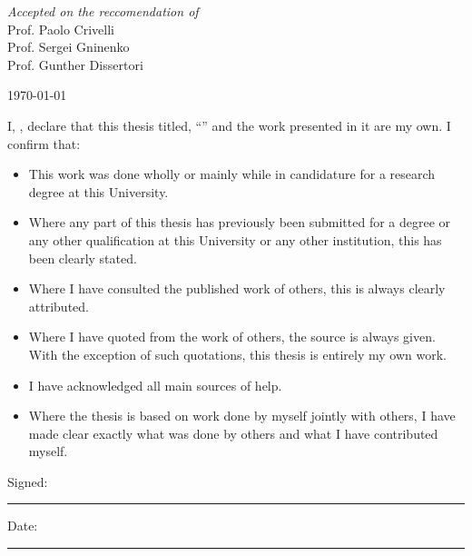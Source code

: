 \begin{titlepage}
\begin{center}

\large \textit{Accepted on the reccomendation of}\\[0.3cm] %
Prof. Paolo Crivelli\\[0.1cm]
Prof. Sergei Gninenko\\[0.1cm]
Prof. Gunther Dissertori\\[0.1cm]

\vfill

{\large \today}\\[4cm] %
 
\vfill
\end{center}
\end{titlepage}


\begin{declaration}
\addchaptertocentry{\authorshipname} %
\noindent I, \authorname, declare that this thesis titled, \enquote{\ttitle} and the work presented in it are my own. I confirm that:

\begin{itemize} 
\item This work was done wholly or mainly while in candidature for a research degree at this University.
\item Where any part of this thesis has previously been submitted for a degree or any other qualification at this University or any other institution, this has been clearly stated.
\item Where I have consulted the published work of others, this is always clearly attributed.
\item Where I have quoted from the work of others, the source is always given. With the exception of such quotations, this thesis is entirely my own work.
\item I have acknowledged all main sources of help.
\item Where the thesis is based on work done by myself jointly with others, I have made clear exactly what was done by others and what I have contributed myself.\\
\end{itemize}
 
\noindent Signed:\\
\rule[0.5em]{25em}{0.5pt} %
 
\noindent Date:\\
\rule[0.5em]{25em}{0.5pt} %
\end{declaration}

